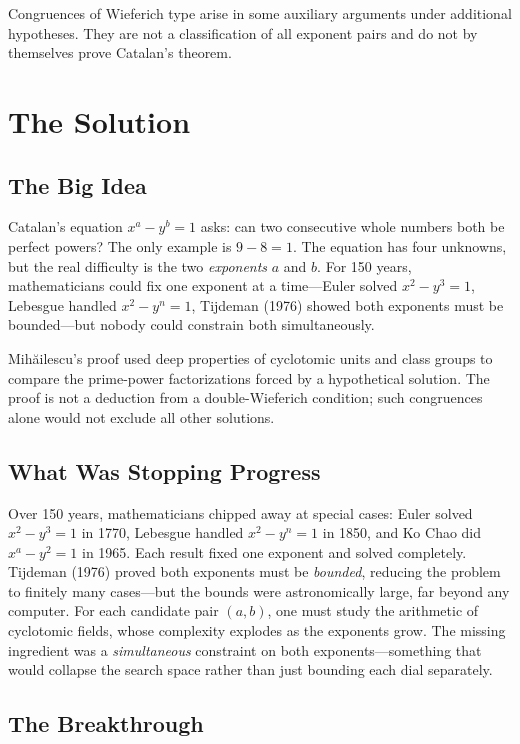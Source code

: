 Congruences of Wieferich type arise in some auxiliary arguments under additional hypotheses. They are not a classification of all exponent pairs and do not by themselves prove Catalan's theorem.

\section{The Solution}

\subsection{The Big Idea}

Catalan's equation $x^a - y^b = 1$ asks: can two consecutive whole numbers both be perfect powers? The only example is $9 - 8 = 1$. The equation has four unknowns, but the real difficulty is the two \emph{exponents} $a$ and $b$. For 150 years, mathematicians could fix one exponent at a time---Euler solved $x^2 - y^3 = 1$, Lebesgue handled $x^2 - y^n = 1$, Tijdeman (1976) showed both exponents must be bounded---but nobody could constrain both simultaneously.

Mihăilescu's proof used deep properties of cyclotomic units and class groups to compare the prime-power factorizations forced by a hypothetical solution. The proof is not a deduction from a double-Wieferich condition; such congruences alone would not exclude all other solutions.

\subsection{What Was Stopping Progress}

Over 150 years, mathematicians chipped away at special cases: Euler solved $x^2 - y^3 = 1$ in 1770, Lebesgue handled $x^2 - y^n = 1$ in 1850, and Ko Chao did $x^a - y^2 = 1$ in 1965. Each result fixed one exponent and solved completely. Tijdeman (1976) proved both exponents must be \emph{bounded}, reducing the problem to finitely many cases---but the bounds were astronomically large, far beyond any computer. For each candidate pair $(a, b)$, one must study the arithmetic of cyclotomic fields, whose complexity explodes as the exponents grow. The missing ingredient was a \emph{simultaneous} constraint on both exponents---something that would collapse the search space rather than just bounding each dial separately.

\subsection{The Breakthrough}

